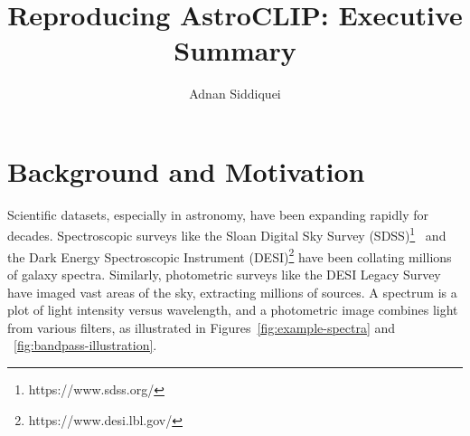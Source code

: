 \documentclass[a4paper,11pt]{article}
\title{\boldmath Reproducing AstroCLIP: Executive Summary}
\author{Adnan Siddiquei}
\affiliation{University of Cambridge}
\begin{document}

\maketitle
\flushbottom

\section{Background and Motivation}\label{sec:introduction}
Scientific datasets, especially in astronomy, have been expanding rapidly for decades.
Spectroscopic surveys like the Sloan Digital Sky Survey (SDSS)\footnote{https://www.sdss.org/}~\citep{york2000} and the
Dark Energy Spectroscopic Instrument (DESI)\footnote{https://www.desi.lbl.gov/} have been collating millions of galaxy spectra.
Similarly, photometric surveys like the DESI Legacy Survey~\citep{desilegacy2018} have imaged vast areas of the sky,
extracting millions of sources.
A spectrum is a plot of light intensity versus wavelength, and a photometric image combines light from various filters,
as illustrated in Figures~\eqref{fig:example-spectra} and ~\eqref{fig:bandpass-illustration}.
\end{document}
